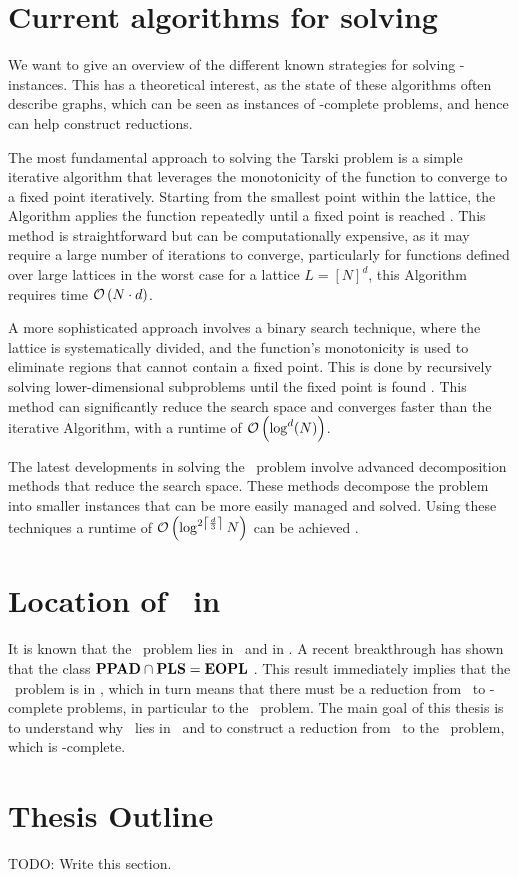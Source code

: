 \section{Current algorithms for solving \Tarski}

We want to give an overview of the different known strategies for solving \Tarski-instances. This has a theoretical interest, as the state of these algorithms often describe graphs, which can be seen as instances of \TFNP-complete problems, and hence can help construct reductions.

The most fundamental approach to solving the Tarski problem is a simple iterative algorithm that leverages the monotonicity of the function to converge to a fixed point iteratively. Starting from the smallest point within the lattice, the Algorithm applies the function repeatedly until a fixed point is reached . This method is straightforward but can be computationally expensive, as it may require a large number of iterations to converge, particularly for functions defined over large lattices in the worst case for a lattice $L = [N]^d$, this Algorithm requires time $\mathcal{O}\left(N \cdot d\right)$.

A more sophisticated approach involves a binary search technique, where the lattice is systematically divided, and the function's monotonicity is used to eliminate regions that cannot contain a fixed point. This is done by recursively solving lower-dimensional subproblems until the fixed point is found . This method can significantly reduce the search space and converges faster than the iterative Algorithm, with a runtime of $\mathcal{O}\left(\log^d(N)\right)$.

The latest developments in solving the \Tarski\ problem involve advanced decomposition methods that reduce the search space. These methods decompose the problem into smaller instances that can be more easily managed and solved. Using these techniques a runtime of $\mathcal{O}\left(\log^{2\left\lceil\frac{d}{3}\right\rceil}{N}\right)$ can be achieved .

\section{Location of \Tarski\ in \TFNP}

It is known that the \Tarski\ problem lies in \PPAD\ and in \PLS. A recent breakthrough has shown that the class $\textbf{PPAD} \cap \textbf{PLS} = \textbf{EOPL}$ . This result immediately implies that the \Tarski\ problem is in \EOPL, which in turn means that there must be a reduction from \Tarski\ to \EOPL-complete problems, in particular to the \EndOfPotentialLine\ problem. The main goal of this thesis is to understand why \Tarski\ lies in \EOPL\ and to construct a reduction from \Tarski\ to the \EndOfPotentialLine\ problem, which is \EOPL-complete.

\section{Thesis Outline}

TODO: Write this section.